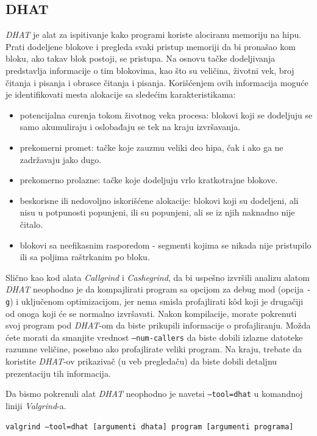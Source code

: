 \documentclass[12pt,oneside]{memoir}
\theoremstyle{plain}
\theoremstyle{definition}
\begin{document}
\subsection{DHAT}
\textit{DHAT} je alat za ispitivanje kako programi koriste alociranu memoriju na hipu. Prati dodeljene blokove i pregleda svaki pristup memoriji da bi pronašao kom bloku, ako takav blok postoji, se pristupa. Na osnovu tačke dodeljivanja predstavlja informacije o tim blokovima, kao što su veličina, životni vek, broj čitanja i pisanja i obrasce čitanja i pisanja. Korišćenjem ovih informacija moguće je identifikovati mesta alokacije sa sledećim karakteristikama:
\begin{itemize}
\item potencijalna curenja tokom životnog veka procesa: blokovi koji se dodeljuju se samo akumuliraju i oslobađaju se tek na kraju izvršavanja.
\item prekomerni promet: tačke koje zauzmu veliki deo hipa, čak i ako ga ne zadržavaju jako dugo.
\item prekomerno prolazne: tačke koje dodeljuju vrlo kratkotrajne blokove.
\item beskorisne ili nedovoljno iskorišćene alokacije: blokovi koji su dodeljeni, ali nisu u potpunosti popunjeni, ili su popunjeni, ali se iz njih naknadno nije čitalo.
\item blokovi sa neefikasnim rasporedom - segmenti kojima se nikada nije pristupilo ili sa poljima raštrkanim po bloku.
\end{itemize}

Slično kao kod alata \textit{Callgrind} i \textit{Cashegrind}, da bi uspešno izvršili analizu alatom \textit{DHAT} neophodno je da kompajlirati program sa opcijom za debug mod (opcija \texttt{-g}) i uključenom optimizacijom, jer nema smisla profajlirati k\^od koji je drugačiji od onoga koji će se normalno izvršavati. Nakon kompilacije, morate pokrenuti svoj program pod \textit{DHAT}-om da biste prikupili informacije o profajliranju. Možda ćete morati da smanjite vrednost \texttt{--num-callers} da biste dobili izlazne datoteke razumne veličine, posebno ako profajlirate veliki program. Na kraju, trebate da koristite \textit{ DHAT}-ov prikazivač (u veb pregledaču) da biste dobili detaljnu prezentaciju tih informacija.

Da bismo pokrenuli alat \textit{ DHAT} neophodno je navetsi \texttt{–tool=dhat} u komandnoj liniji \textit{Valgrind}-a.
\begin{center}
\texttt{valgrind --tool=dhat [argumenti dhata] program [argumenti programa]}
\end{center}
\end{document}
